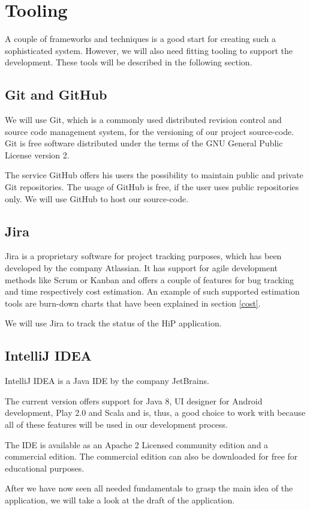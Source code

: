 \section{Tooling}
A couple of frameworks and techniques is a good start for creating such a sophisticated system. However, we will also need fitting tooling to support the development. These tools will be described in the following section.

\subsection{Git and GitHub}
We will use Git, which is a commonly used distributed revision control and source code management system, for the versioning of our project source-code. Git is free software distributed under the terms of the GNU General Public License version 2.

The service GitHub offers his users the possibility to maintain public and private Git repositories. The usage of GitHub is free, if the user uses public repositories only. We will use GitHub to host our source-code.

\subsection{Jira}
Jira is a proprietary software for project tracking purposes, which has been developed by the company Atlassian. It has support for agile development methods like Scrum or Kanban and offers a couple of features for bug tracking and time respectively cost estimation. An example of such supported estimation tools are  burn-down charts that have been explained in section \ref{cost}. 

We will use Jira to track the status of the \ac{HiP} application.

\subsection{IntelliJ IDEA}
IntelliJ IDEA is a Java \ac{IDE} by the company JetBrains. 

The current version offers support for Java 8, UI designer for Android development, Play 2.0 and Scala and is, thus, a good choice to work with because all of these features will be used in our development process.

The \ac{IDE} is available as an Apache 2 Licensed community edition and a commercial edition. The commercial edition can also be downloaded for free for educational purposes.

After we have now seen all needed fundamentals to grasp the main idea of the application, we will take a look at the draft of the application.